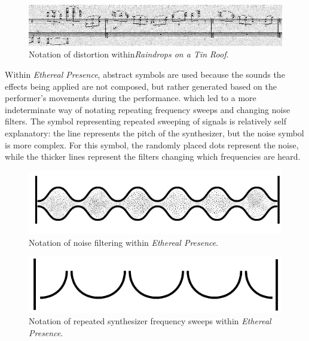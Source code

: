 \begin{figure}
    \centering
    \includegraphics[scale=0.5]{deepfried_1684647887683.jpg}
    \caption{Notation of distortion within\textit{Raindrops on a Tin Roof}.}
    \label{fig:verbbb}
\end{figure}

Within \textit{Ethereal Presence}, abstract symbols are used because the sounds the effects being applied are not composed, but rather generated based on the performer's movements during the performance. which led to a more indeterminate way of notating repeating frequency sweeps and changing noise filters. The symbol representing repeated sweeping of signals is relatively self explanatory: the line represents the pitch of the synthesizer, but the noise symbol is more complex. For this symbol, the randomly placed dots represent the noise, while the thicker lines represent the filters changing which frequencies are heard.

\begin{figure}
    \centering
    \includegraphics[scale=0.5]{noize.png}
    \caption{Notation of noise filtering within \textit{Ethereal Presence}.}
    \label{fig:verbbb}
\end{figure}

\begin{figure}
    \centering
    \includegraphics[scale=0.5]{sweep.png}
    \caption{Notation of repeated synthesizer frequency sweeps within \textit{Ethereal Presence}.}
    \label{fig:verbbb}
\end{figure}



